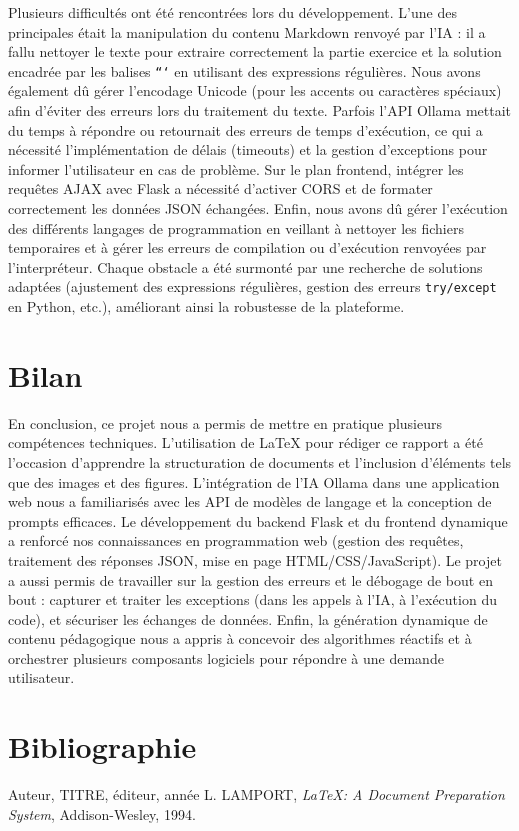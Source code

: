 \documentclass[a4paper, 12pt, twoside]{article}
\begin{document}
Plusieurs difficultés ont été rencontrées lors du développement. L'une des principales était la manipulation du contenu Markdown renvoyé par l'IA : il a fallu nettoyer le texte pour extraire correctement la partie exercice et la solution encadrée par les balises \texttt{```} en utilisant des expressions régulières. Nous avons également dû gérer l'encodage Unicode (pour les accents ou caractères spéciaux) afin d'éviter des erreurs lors du traitement du texte. Parfois l'API Ollama mettait du temps à répondre ou retournait des erreurs de temps d'exécution, ce qui a nécessité l'implémentation de délais (timeouts) et la gestion d'exceptions pour informer l'utilisateur en cas de problème. Sur le plan frontend, intégrer les requêtes AJAX avec Flask a nécessité d'activer CORS et de formater correctement les données JSON échangées. Enfin, nous avons dû gérer l'exécution des différents langages de programmation en veillant à nettoyer les fichiers temporaires et à gérer les erreurs de compilation ou d'exécution renvoyées par l'interpréteur. Chaque obstacle a été surmonté par une recherche de solutions adaptées (ajustement des expressions régulières, gestion des erreurs \texttt{try/except} en Python, etc.), améliorant ainsi la robustesse de la plateforme.

\section{Bilan}

En conclusion, ce projet nous a permis de mettre en pratique plusieurs compétences techniques. L'utilisation de LaTeX pour rédiger ce rapport a été l'occasion d'apprendre la structuration de documents et l'inclusion d'éléments tels que des images et des figures. L'intégration de l'IA Ollama dans une application web nous a familiarisés avec les API de modèles de langage et la conception de prompts efficaces. Le développement du backend Flask et du frontend dynamique a renforcé nos connaissances en programmation web (gestion des requêtes, traitement des réponses JSON, mise en page HTML/CSS/JavaScript). Le projet a aussi permis de travailler sur la gestion des erreurs et le débogage de bout en bout : capturer et traiter les exceptions (dans les appels à l'IA, à l'exécution du code), et sécuriser les échanges de données. Enfin, la génération dynamique de contenu pédagogique nous a appris à concevoir des algorithmes réactifs et à orchestrer plusieurs composants logiciels pour répondre à une demande utilisateur.

\section{Bibliographie}
\renewcommand{\bibname}{}
\renewcommand{\refname}{}
\begin{thebibliography}{2}
 Auteur, TITRE, éditeur, année
 L. LAMPORT, {\it \LaTeX: A Document Preparation System}, Addison-Wesley, 1994.
\end{thebibliography}
\end{document}
